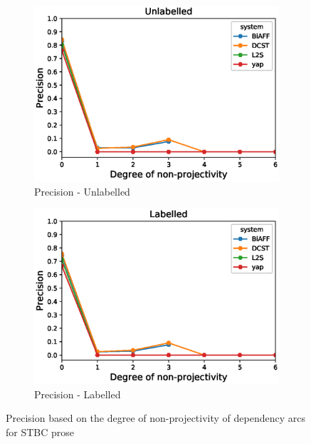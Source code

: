 \documentclass[11pt]{article}
\begin{document}
    \begin{figure}[!ht]
        \centering
        \begin{subfigure}[b]{0.475\textwidth}
            \centering
            \includegraphics[width=\textwidth]{images/TestUnlabelledPrecDeg.eps}
            \caption[Network2]%
            {{\small Precision - Unlabelled}}    
            
        \end{subfigure}
        \hfill
        \begin{subfigure}[b]{0.475\textwidth}  
            \centering 
            \includegraphics[width=\textwidth]{images/TestLabelledPrecDeg.eps}
            \caption[]%
            {{\small Precision - Labelled}}    
            
        \end{subfigure}

        \caption[ Precision based on the degree of non-projectivity of dependency arcs for STBC prose]
        {\small Precision based on the degree of non-projectivity of dependency arcs for STBC prose } 
        \label{nonProj}
    \end{figure} 
\end{document}
